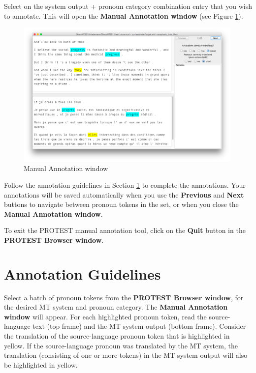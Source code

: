 \documentclass[11pt]{article} %
\begin{document}
Select on the system output + pronoun category combination entry that you wish to annotate. This will open the \textbf{Manual Annotation window} (see Figure \ref{fig:AnnotationWindow}).

\begin{figure}[h!]
    \centering
    \includegraphics[width=0.99\textwidth]{ManualAnnotationWindow.png}
    \caption{Manual Annotation window}
    \label{fig:AnnotationWindow}
\end{figure}

Follow the annotation guidelines in Section \ref{AnnotationGuidelines} to complete the annotations. Your annotations will be saved automatically when you use the \textbf{Previous} and \textbf{Next} buttons to navigate between pronoun tokens in the set, or when you close the \textbf{Manual Annotation window}.

To exit the PROTEST manual annotation tool, click on the \textbf{Quit} button in the \textbf{PROTEST Browser window}.

\section{Annotation Guidelines}
\label{AnnotationGuidelines}
Select a batch of pronoun tokens from the \textbf{PROTEST Browser window}, for the desired MT system and pronoun category. The \textbf{Manual Annotation window} will appear. For each highlighted pronoun token, read the source-language text (top frame) and the MT system output (bottom frame). Consider the translation of the source-language pronoun token that is highlighted in yellow. If the source-language pronoun was translated by the MT system, the translation (consisting of one or more tokens) in the MT system output will also be highlighted in yellow.
\end{document}
